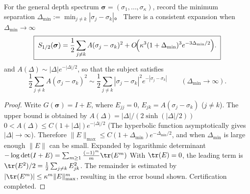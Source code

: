 %

\begin{proposition}\label{prop:xi-hellinger-cluster-expansion-large-separation}
For the general depth spectrum \(\boldsymbol{\sigma}=(\sigma_1,\dots,\sigma_\kappa)\), record the minimum separation
\(
\Delta_{\min}:=\min_{j\neq k}|\sigma_j-\sigma_k|
\)。
There is a consistent expansion when \(\Delta_{\min}\to\infty\)
\[
\boxed{\;
S_{1/2}(\boldsymbol{\sigma})
=\frac12\sum_{j\neq k}A(\sigma_j-\sigma_k)^{2}
+O\!\Bigl(\kappa^{3}(1+\Delta_{\min})^{3}e^{-3\Delta_{\min}/2}\Bigr).\;}
\]
and
\(
A(\Delta)\sim |\Delta|e^{-|\Delta|/2}
\), so that the subject satisfies
\[
\frac12\sum_{j\neq k}A(\sigma_j-\sigma_k)^2
\sim \frac12\sum_{j\neq k}|\sigma_j-\sigma_k|^2e^{-|\sigma_j-\sigma_k|}
\qquad(\Delta_{\min}\to\infty).
\]
\end{proposition}
\begin{proof}
Write \(G(\boldsymbol{\sigma})=I+E\), where \(E_{jj}=0\), \(E_{jk}=A(\sigma_j-\sigma_k)\) (\(j\neq k\)).
The upper bound is obtained by \(A(\Delta)=|\Delta|/(2\sinh(|\Delta|/2))\)
\(
0<A(\Delta)\le C(1+|\Delta|)e^{-|\Delta|/2}
\)
(The hyperbolic function asymptotically gives \(|\Delta|\to\infty\)).
Therefore \(\|E\|_{\max}\le C(1+\Delta_{\min})e^{-\Delta_{\min}/2}\), and when \(\Delta_{\min}\) is large enough \(\|E\|\) can be small.
Expanded by logarithmic determinant
\(
-\log\det(I+E)=\sum_{m\ge 1}\frac{(-1)^m}{m}\tr(E^m)
\)
With \(\tr(E)=0\), the leading term is \(\tr(E^2)/2=\frac12\sum_{j\neq k}E_{jk}^2\).
The remainder is estimated by \(|\tr(E^m)|\le \kappa^m\|E\|_{\max}^m\), resulting in the error bound shown. Certification completed.
\end{proof}

